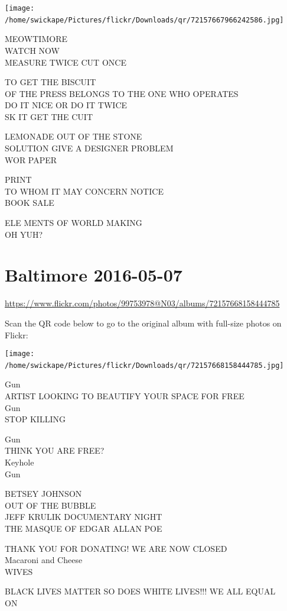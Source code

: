 \documentclass[10pt,letterpaper]{article}
\begin{document}
\texttt{[image: /home/swickape/Pictures/flickr/Downloads/qr/72157667966242586.jpg]}
\

MEOWTIMORE\\
WATCH NOW\\
MEASURE TWICE CUT ONCE

TO GET THE BISCUIT\\
OF THE PRESS BELONGS TO THE ONE WHO OPERATES\\
DO IT NICE OR DO IT TWICE\\
SK IT GET THE CUIT

LEMONADE OUT OF THE STONE\\
SOLUTION GIVE A DESIGNER PROBLEM\\
WOR PAPER

PRINT\\
TO WHOM IT MAY CONCERN NOTICE\\
BOOK SALE

ELE MENTS OF WORLD MAKING\\
OH YUH?
\

\section*{Baltimore 2016-05-07}

\url{https://www.flickr.com/photos/99753978@N03/albums/72157668158444785}

Scan the QR code below to go to the original album with full-size photos on Flickr:

\texttt{[image: /home/swickape/Pictures/flickr/Downloads/qr/72157668158444785.jpg]}
\

Gun\\
ARTIST LOOKING TO BEAUTIFY YOUR SPACE FOR FREE\\
Gun\\
STOP KILLING

Gun\\
THINK YOU ARE FREE?\\
Keyhole\\
Gun

BETSEY JOHNSON\\
OUT OF THE BUBBLE\\
JEFF KRULIK DOCUMENTARY NIGHT\\
THE MASQUE OF EDGAR ALLAN POE

THANK YOU FOR DONATING!  WE ARE NOW CLOSED\\
Macaroni and Cheese\\
WIVES

BLACK LIVES MATTER SO DOES WHITE LIVES!!! WE ALL EQUAL\\
ON
\
\end{document}
